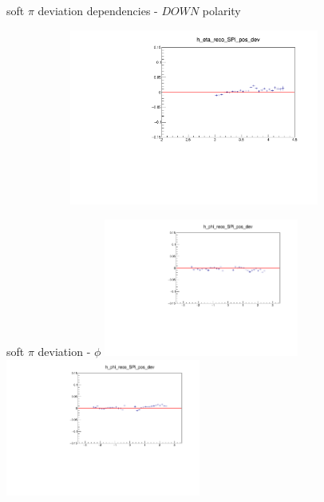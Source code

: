 \documentclass[11pt]{beamer}
\begin{document}
\begin{frame}{soft $\pi$ deviation dependencies - $DOWN$ polarity}
\begin{figure}
\begin{subfigure}{0.45\textwidth}
\end{subfigure}
\begin{subfigure}{0.45\textwidth}
\includegraphics[width=0.9\textwidth]{sec/down_pdf/deviation/h_eta_reco_SPi_pos_dev.pdf}
\end{subfigure}
\end{figure}
\end{frame}
\begin{frame}{soft $\pi$ deviation - $\phi$}
\centering
\includegraphics[width=0.48\textwidth]{sec/up_pdf/deviation/h_phi_reco_SPi_pos_dev.pdf}
\includegraphics[width=0.48\textwidth]{sec/down_pdf/deviation/h_phi_reco_SPi_pos_dev.pdf}
\end{frame}
\end{document}
